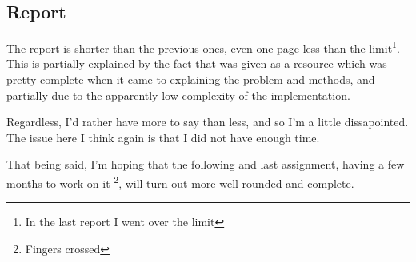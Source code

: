 \documentclass[10pt, a4paper]{article}
\begin{document}
\subsection{Report}
The report is shorter than the previous ones, even one page less than the limit\footnote{In the last report
I went over the limit}. This is partially explained by the fact that \cite{floros2020} was given as a
resource which was pretty complete when it came to explaining the problem and methods, and partially due
to the apparently low complexity of the implementation.

Regardless, I'd rather have more to say than less, and so I'm a little dissapointed. The issue here I think
again is that I did not have enough time.

That being said, I'm hoping that the following and last assignment, having a few months to work on it
\footnote{Fingers crossed}, will turn out more well-rounded and complete.

\printbibliography
\end{document}
